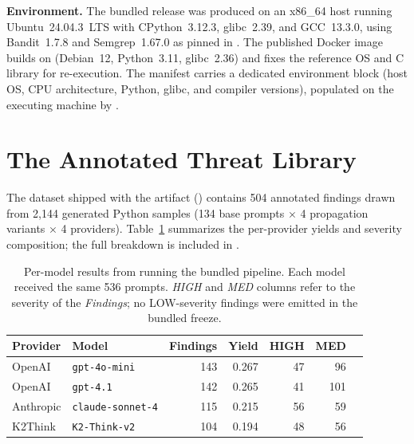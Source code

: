 \documentclass[sigconf,review,anonymous=false]{acmart}
\begin{document}
\textbf{Environment.} The bundled release was produced on an
x86\_64 host running Ubuntu~24.04.3~LTS with CPython~3.12.3,
glibc~2.39, and GCC~13.3.0, using Bandit~1.7.8 and Semgrep~1.67.0 as
pinned in . The published Docker image
builds on  (Debian~12, Python~3.11,
glibc~2.36) and fixes the reference OS and C library for
re-execution. The manifest carries a dedicated environment block
(host OS, CPU architecture, Python, glibc, and compiler versions),
populated on the executing machine by
.

\section{The Annotated Threat Library}

The dataset shipped with the artifact
()
contains 504 annotated findings drawn from 2{,}144 generated Python
samples (134 base prompts $\times$ 4 propagation variants $\times$ 4
providers). Table~\ref{tab:providers} summarizes the per-provider
yields and severity composition; the full breakdown is included in
.

\begin{table}[!htp]
\caption{Per-model results from running the bundled pipeline.
Each model received the same 536 prompts. \textit{HIGH} and \textit{MED} columns refer to the severity of the
\textit{Findings}; no LOW-severity findings were emitted in the bundled
freeze.}
\label{tab:providers}
\small
\begin{tabular}{@{}llrrrrr@{}}
\toprule
Provider & Model  & Findings & Yield & HIGH & MED \\
\midrule
OpenAI    & \texttt{gpt-4o-mini}               & 143 & 0.267 & 47 & 96  \\
OpenAI    & \texttt{gpt-4.1}                   & 142 & 0.265 & 41 & 101 \\
Anthropic & \texttt{claude-sonnet-4}  & 115 & 0.215 & 56 & 59  \\
K2Think   & \texttt{K2-Think-v2}               & 104 & 0.194 & 48 & 56  \\
\bottomrule
\end{tabular}

\end{table}
\end{document}
